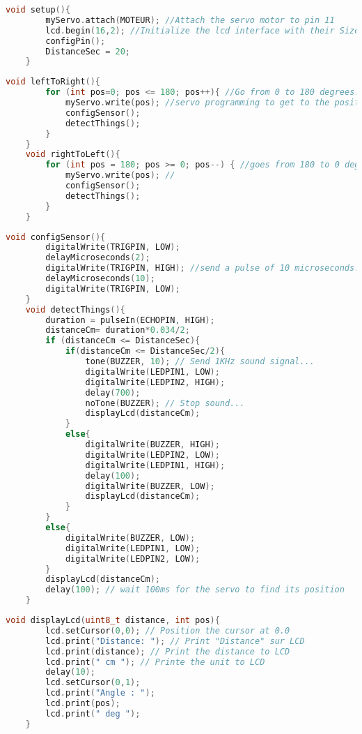 \begin{lstlisting}[language=cpp,caption={Setup Funtion}]
    void setup(){
        myServo.attach(MOTEUR); //Attach the servo motor to pin 11
        lcd.begin(16,2); //Initialize the lcd interface with their Size
        configPin();
        DistanceSec = 20;
    }
\end{lstlisting}

\begin{lstlisting}[language=cpp,caption={Define leftToRight and rightToLeft Function}]
    void leftToRight(){
        for (int pos=0; pos <= 180; pos++){ //Go from 0 to 180 degrees.
            myServo.write(pos); //servo programming to get to the position(pos).
            configSensor();
            detectThings();
        }
    }
    void rightToLeft(){
        for (int pos = 180; pos >= 0; pos--) { //goes from 180 to 0 degree
            myServo.write(pos); //
            configSensor();
            detectThings();
        }
    }
\end{lstlisting}

\begin{lstlisting}[language=cpp,caption={Define detectThings and configSensor Function}]
    void configSensor(){
        digitalWrite(TRIGPIN, LOW);
        delayMicroseconds(2);
        digitalWrite(TRIGPIN, HIGH); //send a pulse of 10 microseconds.
        delayMicroseconds(10);
        digitalWrite(TRIGPIN, LOW);
    }
    void detectThings(){
        duration = pulseIn(ECHOPIN, HIGH);
        distanceCm= duration*0.034/2;
        if (distanceCm <= DistanceSec){
            if(distanceCm <= DistanceSec/2){
                tone(BUZZER, 10); // Send 1KHz sound signal...
                digitalWrite(LEDPIN1, LOW);
                digitalWrite(LEDPIN2, HIGH);
                delay(700);
                noTone(BUZZER); // Stop sound...
                displayLcd(distanceCm);
            }
            else{
                digitalWrite(BUZZER, HIGH);
                digitalWrite(LEDPIN2, LOW);
                digitalWrite(LEDPIN1, HIGH);
                delay(100);
                digitalWrite(BUZZER, LOW);
                displayLcd(distanceCm);
            }
        }
        else{
            digitalWrite(BUZZER, LOW);
            digitalWrite(LEDPIN1, LOW);
            digitalWrite(LEDPIN2, LOW);
        }
        displayLcd(distanceCm);
        delay(100); // wait 100ms for the servo to find its position
    }
\end{lstlisting}

\begin{lstlisting}[language=cpp,caption={Define displayLCD Funtion}]
    void displayLcd(uint8_t distance, int pos){
        lcd.setCursor(0,0); // Position the cursor at 0.0
        lcd.print("Distance: "); // Print "Distance" sur LCD
        lcd.print(distance); // Print the distance to LCD
        lcd.print(" cm "); // Printe the unit to LCD
        delay(10);
        lcd.setCursor(0,1);
        lcd.print("Angle : ");
        lcd.print(pos);
        lcd.print(" deg ");
    }
\end{lstlisting}